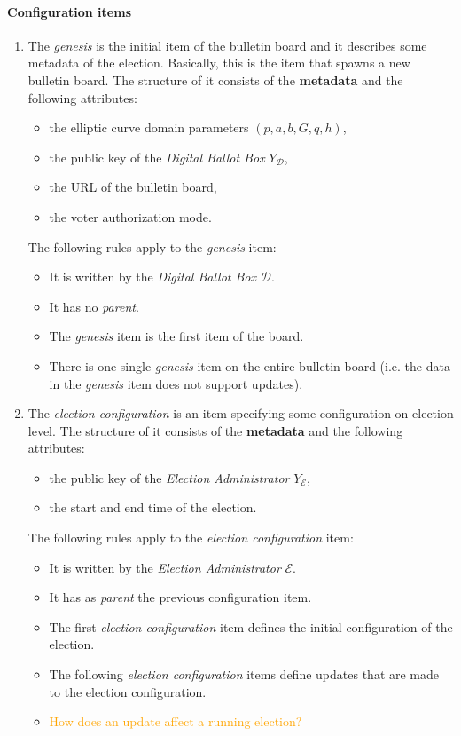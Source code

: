 \paragraph{Configuration items}
\begin{enumerate}
    \item 
        The \textit{genesis} is the initial item of the bulletin board and it describes some metadata of the election. Basically, this is the item that spawns a new bulletin board. The structure of it consists of the \textbf{metadata} and the following attributes:
        \begin{itemize}
            \item the elliptic curve domain parameters $(p, a, b, G, q, h)$,
            \item the public key of the \textit{Digital Ballot Box} $Y_\mathcal{D}$,
            \item the URL of the bulletin board,
            \item the voter authorization mode.
        \end{itemize}
        The following rules apply to the \textit{genesis} item:
        \begin{itemize}
            \item It is written by the \textit{Digital Ballot Box} $\mathcal{D}$.
            \item It has no \textit{parent}.
            \item The \textit{genesis} item is the first item of the board.
            \item There is one single \textit{genesis} item on the entire bulletin board (i.e. the data in the \textit{genesis} item does not support updates). 
        \end{itemize}
    \item
        The \textit{election configuration} is an item specifying some configuration on election level. The structure of it consists of the \textbf{metadata} and the following attributes:
        \begin{itemize}
            \item the public key of the \textit{Election Administrator} $Y_\mathcal{E}$,
            \item the start and end time of the election.
        \end{itemize}
        The following rules apply to the \textit{election configuration} item:
        \begin{itemize}
            \item It is written by the \textit{Election Administrator} $\mathcal{E}$.
            \item It has as \textit{parent} the previous configuration item.
            \item The first \textit{election configuration} item defines the initial configuration of the election.
            \item The following \textit{election configuration} items define updates that are made to the election configuration.
            \item \textcolor{orange}{How does an update affect a running election?}
        \end{itemize}
    

\end{enumerate}
